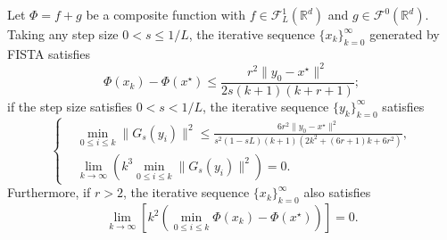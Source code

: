 \documentclass[10pt]{beamer}
\begin{document}
\begin{frame}
  \begin{theorem}
    \label{thm: fista}
    Let $\Phi = f + g$ be a composite function with $f \in \mathcal{F}_{L}^1(\mathbb{R}^d)$ and $g \in \mathcal{F}^0(\mathbb{R}^d)$. Taking any step size $0 < s \leq 1/L$, the iterative sequence $\{x_k\}_{k=0}^{\infty}$ generated by FISTA satisfies
    \begin{equation}
      \label{eqn: fista-obj}
      \Phi(x_k) - \Phi(x^\star) \leq \frac{r^2\|y_0 - x^\star\|^2}{2s(k+1)(k+r+1)};   
    \end{equation}
    if the step size satisfies $0< s< 1/L$, the iterative sequence $\{y_k\}_{k=0}^{\infty}$ satisfies
    \begin{equation}
      \label{eqn: fista-grad}
      \left\{\begin{aligned}
      & \min_{0\leq i \leq k} \| G_s(y_i) \|^2 \leq \frac{6r^2\|y_0 - x^\star\|^2}{s^2(1-sL) (k+1)\left(2k^2 + (6r+1)k + 6r^2 \right)},\\
      & \lim_{k\rightarrow \infty} \left(k^3\min_{0\leq i \leq k} \| G_s(y_i) \|^2\right) = 0.
      \end{aligned} \right.
    \end{equation}
    Furthermore, if $r>2$, the iterative sequence $\{x_k\}_{k=0}^{\infty}$ also satisfies
    \begin{equation}
      \label{eqn: fista-obj-fast}
      \lim_{k\rightarrow \infty} \left[k^2 \left(\min_{0\leq i \leq k} \Phi(x_k) - \Phi(x^\star)\right)\right] = 0.
    \end{equation}
  \end{theorem}
\end{frame}
\end{document}
